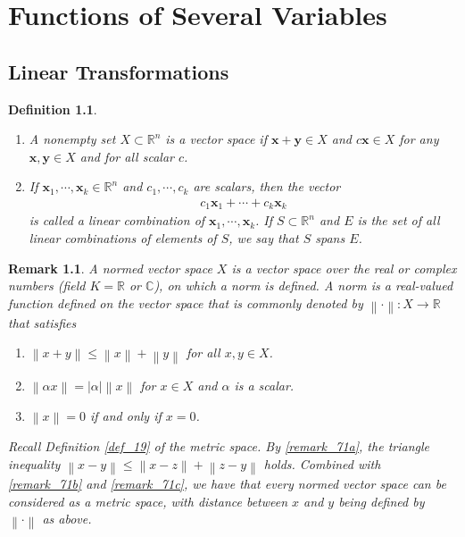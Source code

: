\documentclass[10pt]{book}
\newtheorem{definition}{Definition}[chapter]
\newtheorem{remark}{Remark}[chapter]
\theoremstyle{definition}
\numberwithin{equation}{chapter}
\begin{document}
\chapter{Functions of Several Variables}

\section{Linear Transformations}

\begin{definition}
~\begin{enumerate}[label=(\alph*)]
    \item A nonempty set $X \subset \mathbb{R}^n$ is a vector space if $\mathbf{x} + \mathbf{y} \in X$ and $c\mathbf{x} \in X$ for any $\mathbf{x}, \mathbf{y} \in X$ and for all scalar $c$.
    
    \item If $\mathbf{x}_1, \cdots, \mathbf{x}_k \in \mathbb{R}^n$ and $c_1, \cdots, c_k$ are scalars, then the vector 
    \begin{align*}
        c_1 \mathbf{x}_1 + \cdots + c_k \mathbf{x}_k
    \end{align*}
    is called a linear combination of $\mathbf{x}_1, \cdots, \mathbf{x}_k$. If $S \subset \mathbb{R}^n$ and $E$ is the set of all linear combinations of elements of $S$, we say that $S$ spans $E$.
\end{enumerate}
\end{definition}

\begin{remark}
A normed vector space $X$ is a vector space over the real or complex numbers (field $K = \mathbb{R}$ or $\mathbb{C}$), on which a norm is defined. A norm is a real-valued function defined on the vector space that is commonly denoted by $\left\|\cdot\right\|: X \to \mathbb{R}$ that satisfies
\begin{enumerate}[label=(\roman*)]
    \item $\left\|x + y\right\| \leq \left\|x\right\| + \left\|y\right\|$ for all $x,y \in X$. \label{remark_71a} 
    
    \item $\left\|\alpha x\right\| = \left|\alpha\right| \left\|x\right\|$ for $x \in X$ and $\alpha$ is a scalar. \label{remark_71b}
    
    \item $\left\|x\right\| = 0$ if and only if $x = 0$. \label{remark_71c}
\end{enumerate}

Recall Definition \ref{def_19} of the metric space. By \ref{remark_71a}, the triangle inequality $\left\|x - y\right\| \leq \left\|x - z\right\| + \left\|z - y\right\|$ holds. Combined with \ref{remark_71b} and \ref{remark_71c}, we have that every normed vector space can be considered as a metric space, with distance between $x$ and $y$ being defined by $\left\|\cdot\right\|$ as above.
\end{remark}
\end{document}
